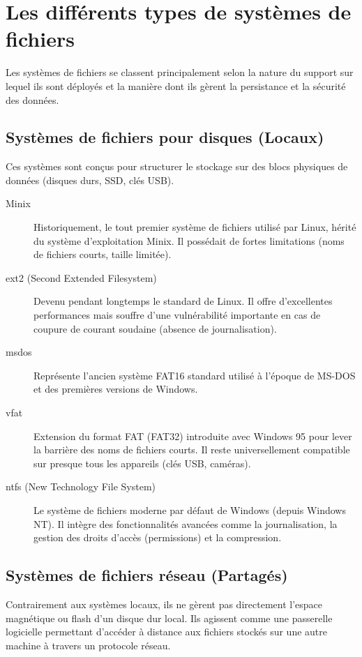 \chapter{Les différents types de systèmes de fichiers}

Les systèmes de fichiers se classent principalement selon la nature du support sur lequel ils sont déployés et la manière dont ils gèrent la persistance et la sécurité des données.

\section{Systèmes de fichiers pour disques (Locaux)}
Ces systèmes sont conçus pour structurer le stockage sur des blocs physiques de données (disques durs, SSD, clés USB).

\begin{description}
    \item[Minix] Historiquement, le tout premier système de fichiers utilisé par Linux, hérité du système d'exploitation Minix. Il possédait de fortes limitations (noms de fichiers courts, taille limitée).
    \item[ext2 (Second Extended Filesystem)] Devenu pendant longtemps le standard de Linux. Il offre d'excellentes performances mais souffre d'une vulnérabilité importante en cas de coupure de courant soudaine (absence de journalisation).
    \item[msdos] Représente l'ancien système FAT16 standard utilisé à l'époque de MS-DOS et des premières versions de Windows. 
    \item[vfat] Extension du format FAT (FAT32) introduite avec Windows 95 pour lever la barrière des noms de fichiers courts. Il reste universellement compatible sur presque tous les appareils (clés USB, caméras).
    \item[ntfs (New Technology File System)] Le système de fichiers moderne par défaut de Windows (depuis Windows NT). Il intègre des fonctionnalités avancées comme la journalisation, la gestion des droits d'accès (permissions) et la compression.
\end{description}


\section{Systèmes de fichiers réseau (Partagés)}
Contrairement aux systèmes locaux, ils ne gèrent pas directement l'espace magnétique ou flash d'un disque dur local. Ils agissent comme une passerelle logicielle permettant d'accéder à distance aux fichiers stockés sur une autre machine à travers un protocole réseau.


